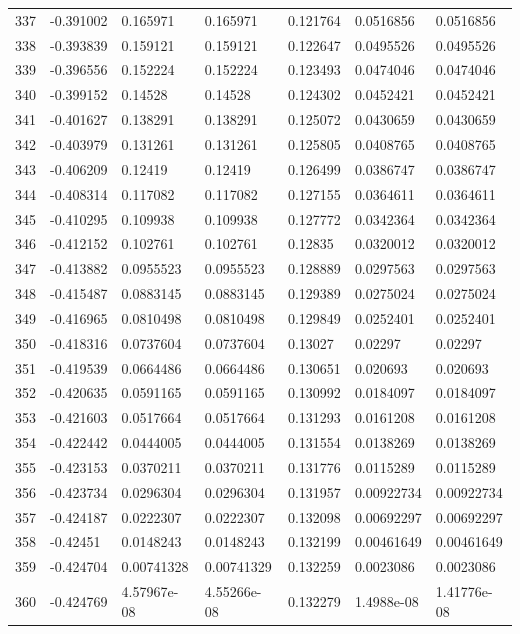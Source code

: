\begin{longtable}{l|lll|lll}
 337 & -0.391002    & 0.165971    & 0.165971    &  0.121764    & 0.0516856   & 0.0516856   \\
 338 & -0.393839    & 0.159121    & 0.159121    &  0.122647    & 0.0495526   & 0.0495526   \\
 339 & -0.396556    & 0.152224    & 0.152224    &  0.123493    & 0.0474046   & 0.0474046   \\
 340 & -0.399152    & 0.14528     & 0.14528     &  0.124302    & 0.0452421   & 0.0452421   \\
 341 & -0.401627    & 0.138291    & 0.138291    &  0.125072    & 0.0430659   & 0.0430659   \\
 342 & -0.403979    & 0.131261    & 0.131261    &  0.125805    & 0.0408765   & 0.0408765   \\
 343 & -0.406209    & 0.12419     & 0.12419     &  0.126499    & 0.0386747   & 0.0386747   \\
 344 & -0.408314    & 0.117082    & 0.117082    &  0.127155    & 0.0364611   & 0.0364611   \\
 345 & -0.410295    & 0.109938    & 0.109938    &  0.127772    & 0.0342364   & 0.0342364   \\
 346 & -0.412152    & 0.102761    & 0.102761    &  0.12835     & 0.0320012   & 0.0320012   \\
 347 & -0.413882    & 0.0955523   & 0.0955523   &  0.128889    & 0.0297563   & 0.0297563   \\
 348 & -0.415487    & 0.0883145   & 0.0883145   &  0.129389    & 0.0275024   & 0.0275024   \\
 349 & -0.416965    & 0.0810498   & 0.0810498   &  0.129849    & 0.0252401   & 0.0252401   \\
 350 & -0.418316    & 0.0737604   & 0.0737604   &  0.13027     & 0.02297     & 0.02297     \\
 351 & -0.419539    & 0.0664486   & 0.0664486   &  0.130651    & 0.020693    & 0.020693    \\
 352 & -0.420635    & 0.0591165   & 0.0591165   &  0.130992    & 0.0184097   & 0.0184097   \\
 353 & -0.421603    & 0.0517664   & 0.0517664   &  0.131293    & 0.0161208   & 0.0161208   \\
 354 & -0.422442    & 0.0444005   & 0.0444005   &  0.131554    & 0.0138269   & 0.0138269   \\
 355 & -0.423153    & 0.0370211   & 0.0370211   &  0.131776    & 0.0115289   & 0.0115289   \\
 356 & -0.423734    & 0.0296304   & 0.0296304   &  0.131957    & 0.00922734  & 0.00922734  \\
 357 & -0.424187    & 0.0222307   & 0.0222307   &  0.132098    & 0.00692297  & 0.00692297  \\
 358 & -0.42451     & 0.0148243   & 0.0148243   &  0.132199    & 0.00461649  & 0.00461649  \\
 359 & -0.424704    & 0.00741328  & 0.00741329  &  0.132259    & 0.0023086   & 0.0023086   \\
 360 & -0.424769    & 4.57967e-08 & 4.55266e-08 &  0.132279    & 1.4988e-08  & 1.41776e-08 \\
\hline
\end{longtable}



